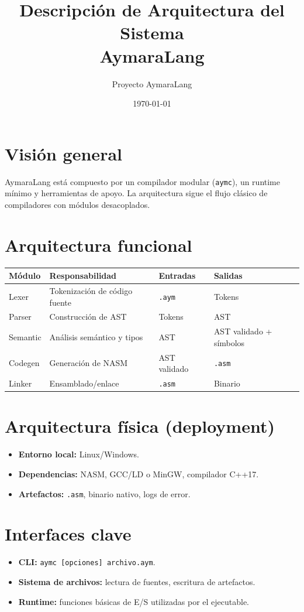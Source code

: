 \documentclass[11pt,a4paper]{article}
\title{Descripción de Arquitectura del Sistema\\AymaraLang}
\author{Proyecto AymaraLang}
\date{\today}
\begin{document}
\maketitle

\section{Visión general}
AymaraLang está compuesto por un compilador modular (\texttt{aymc}), un runtime mínimo y herramientas de apoyo. La arquitectura sigue el flujo clásico de compiladores con módulos desacoplados.

\section{Arquitectura funcional}
\begin{longtable}{@{}p{3cm}p{4cm}p{4cm}p{4cm}@{}}
\toprule
\textbf{Módulo} & \textbf{Responsabilidad} & \textbf{Entradas} & \textbf{Salidas} \\ \midrule
Lexer & Tokenización de código fuente & \texttt{.aym} & Tokens \\
Parser & Construcción de AST & Tokens & AST \\
Semantic & Análisis semántico y tipos & AST & AST validado + símbolos \\
Codegen & Generación de NASM & AST validado & \texttt{.asm} \\
Linker & Ensamblado/enlace & \texttt{.asm} & Binario \\
\bottomrule
\end{longtable}

\section{Arquitectura física (deployment)}
\begin{itemize}
    \item \textbf{Entorno local:} Linux/Windows.
    \item \textbf{Dependencias:} NASM, GCC/LD o MinGW, compilador C++17.
    \item \textbf{Artefactos:} \texttt{.asm}, binario nativo, logs de error.
\end{itemize}

\section{Interfaces clave}
\begin{itemize}
    \item \textbf{CLI:} \texttt{aymc [opciones] archivo.aym}.
    \item \textbf{Sistema de archivos:} lectura de fuentes, escritura de artefactos.
    \item \textbf{Runtime:} funciones básicas de E/S utilizadas por el ejecutable.
\end{itemize}
\end{document}
